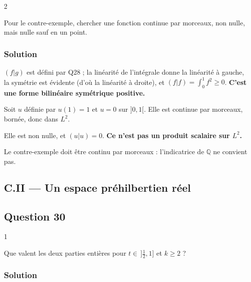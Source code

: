 \documentclass[11pt,a4paper]{article}
\begin{document}
\begin{indication}{2}

Pour le contre-exemple, chercher une fonction continue par morceaux, non nulle, mais nulle sauf en un point.

\end{indication}

\hypertarget{solution-28}{%
\subsubsection{Solution}\label{solution-28}}

\((f|g)\) est défini par Q28 ; la linéarité de l'intégrale donne la linéarité à gauche, la symétrie est évidente (d'où la linéarité à droite), et \((f|f)=\int_0^1f^2\geqslant0\). \textbf{C'est une forme bilinéaire symétrique positive.}

Soit \(u\) définie par \(u(1)=1\) et \(u=0\) sur \(]0,1[\). Elle est continue par morceaux, bornée, donc dans \(L^2\).

Elle est non nulle, et \((u|u)=0\). \textbf{Ce n'est pas un produit scalaire sur \(L^2\).}

\begin{piege}

Le contre-exemple doit être continu par morceaux : l'indicatrice de \(\mathbb Q\) ne convient pas.

\end{piege}

\hypertarget{c.ii-un-espace-pruxe9hilbertien-ruxe9el}{%
\subsection{C.II --- Un espace préhilbertien réel}\label{c.ii-un-espace-pruxe9hilbertien-ruxe9el}}

\hypertarget{question-30}{%
\subsection{Question 30}\label{question-30}}

\begin{indication}{1}

Que valent les deux parties entières pour \(t\in\,]\frac12,1]\) et \(k\geqslant2\) ?

\end{indication}

\hypertarget{solution-29}{%
\subsubsection{Solution}\label{solution-29}}
\end{document}
